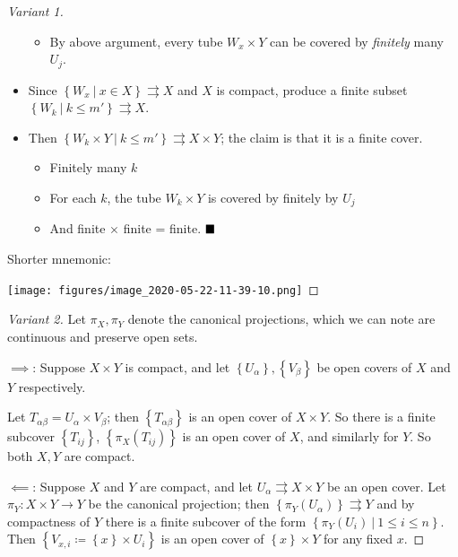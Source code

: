 \begin{solution}
\begin{proof}[Variant 1]
\begin{itemize}
  \begin{itemize}
  \tightlist
  \item
    By above argument, every tube \(W_x \times Y\) can be covered by
    \emph{finitely} many \(U_j\).
  \end{itemize}
\item
  Since
  \(\left\{{W_x{~\mathrel{\Big|}~}x\in X}\right\}\rightrightarrows X\)
  and \(X\) is compact, produce a finite subset
  \(\left\{{W_k {~\mathrel{\Big|}~}k\leq m'}\right\} \rightrightarrows X\).
\item
  Then
  \(\left\{{W_k\times Y{~\mathrel{\Big|}~}k\leq m'}\right\} \rightrightarrows X\times Y\);
  the claim is that it is a finite cover.

  \begin{itemize}
  \tightlist
  \item
    Finitely many \(k\)
  \item
    For each \(k\), the tube \(W_k \times Y\) is covered by finitely by
    \(U_j\)
  \item
    And finite \(\times\) finite = finite. \(\hfill\blacksquare\)
  \end{itemize}
\end{itemize}

Shorter mnemonic:

\texttt{[image: figures/image\_2020-05-22-11-39-10.png]}

\end{proof}

\begin{proof}[Variant 2]

Let \(\pi_X, \pi_Y\) denote the canonical projections, which we can note
are continuous and preserve open sets.

\(\implies\): Suppose \(X\times Y\) is compact, and let
\(\left\{{U_\alpha}\right\}, \left\{{V_\beta}\right\}\) be open covers
of \(X\) and \(Y\) respectively.

Let \(T_{\alpha\beta} = U_\alpha \times V_\beta\); then
\(\left\{{T_{\alpha\beta}}\right\}\) is an open cover of \(X\times Y\).
So there is a finite subcover \(\left\{{T_{ij}}\right\}\),
\(\left\{{\pi_X(T_{ij})}\right\}\) is an open cover of \(X\), and
similarly for \(Y\). So both \(X,Y\) are compact.

\(\impliedby\): Suppose \(X\) and \(Y\) are compact, and let
\(U_\alpha \rightrightarrows X\times Y\) be an open cover. Let
\(\pi_Y: X\times Y \to Y\) be the canonical projection; then
\(\left\{{\pi_Y(U_\alpha)}\right\}\rightrightarrows Y\) and by
compactness of \(Y\) there is a finite subcover of the form
\(\left\{{\pi_Y(U_i) {~\mathrel{\Big|}~}1\leq i \leq n}\right\}\). Then
\(\left\{{V_{x, i} \coloneqq\left\{{x}\right\} \times U_i}\right\}\) is
an open cover of \(\left\{{x}\right\} \times Y\) for any fixed \(x\).


\end{proof}
\end{solution}
